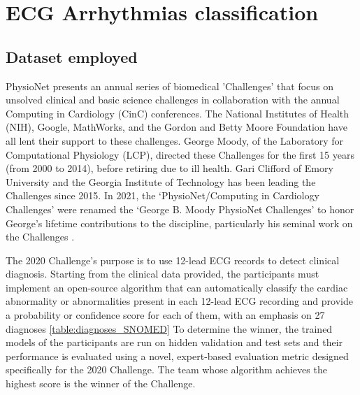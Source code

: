 \chapter{ECG Arrhythmias classification} \label{chap5}

\section{Dataset employed} \label{5dataset}

PhysioNet presents an annual series of biomedical 'Challenges' that focus on unsolved clinical and basic science challenges in collaboration with the annual Computing in Cardiology (CinC) conferences. The National Institutes of Health (NIH), Google, MathWorks, and the Gordon and Betty Moore Foundation have all lent their support to these challenges. George Moody, of the Laboratory for Computational Physiology (LCP), directed these Challenges for the first 15 years (from 2000 to 2014), before retiring due to ill health. Gari Clifford of Emory University and the Georgia Institute of Technology has been leading the Challenges since 2015. In 2021, the ‘PhysioNet/Computing in Cardiology Challenges’ were renamed the ‘George B. Moody PhysioNet Challenges’ to honor George's lifetime contributions to the discipline, particularly his seminal work on the Challenges \cite{dataset1}.

The 2020 Challenge's purpose is to use 12-lead ECG records to detect clinical
diagnosis. Starting from the clinical data provided, the participants must implement an open-source algorithm that can automatically classify the
cardiac abnormality or abnormalities present in each 12-lead ECG recording
and provide a probability or confidence score for each of them, with an
emphasis on 27 diagnoses \ref{table:diagnoses_SNOMED} To determine the winner, the trained
models of the participants are run on hidden validation and test sets and
their performance is evaluated using a novel, expert-based evaluation
metric designed specifically for the 2020 Challenge. The team whose
algorithm achieves the highest score is the winner of the Challenge.


